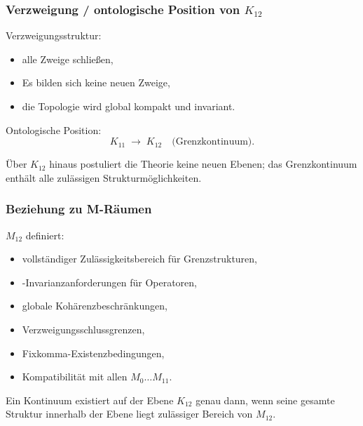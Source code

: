 \subsubsection{Verzweigung / ontologische Position von $K_{12}$}

Verzweigungsstruktur:
\begin{itemize}
    \item alle Zweige schließen,
    \item Es bilden sich keine neuen Zweige,
    \item die Topologie wird global kompakt und invariant.
\end{itemize}

Ontologische Position:
\[
K_{11} \;\longrightarrow\; K_{12} \quad \text{(Grenzkontinuum)}.
\]

Über $K_{12}$ hinaus postuliert die Theorie keine neuen Ebenen; das Grenzkontinuum
enthält alle zulässigen Strukturmöglichkeiten.

\subsubsection{Beziehung zu M-Räumen}

$M_{12}$ definiert:
\begin{itemize}
    \item vollständiger Zulässigkeitsbereich für Grenzstrukturen,
    \item-Invarianzanforderungen für Operatoren,
    \item globale Kohärenzbeschränkungen,
    \item Verzweigungsschlussgrenzen,
    \item Fixkomma-Existenzbedingungen,
    \item Kompatibilität mit allen $M_0\dots M_{11}$.
\end{itemize}

Ein Kontinuum existiert auf der Ebene $K_{12}$ genau dann, wenn seine gesamte Struktur innerhalb der Ebene liegt
zulässiger Bereich von $M_{12}$.

